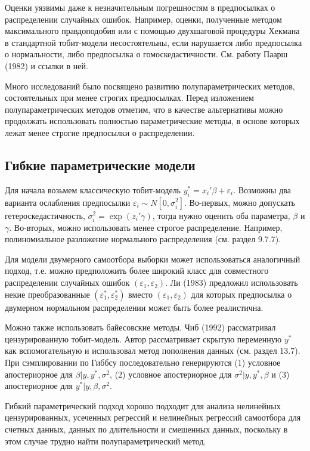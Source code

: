Оценки уязвимы даже к незначительным погрешностям в предпосылках о распределении случайных ошибок. Например, оценки, полученные методом максимального правдоподобия или с помощью двухшаговой процедуры Хекмана в стандартной тобит-модели несостоятельны, если нарушается либо предпосылка о нормальности, либо предпосылка о гомоскедастичности. См. работу Паарш (1982) и ссылки в ней.

Много исследований было посвящено развитию полупараметрических методов, состоятельных при менее строгих предпосылках. Перед изложением полупараметрических методов отметим, что в качестве альтернативы можно продолжать использовать полностью параметрические методы, в основе которых лежат менее строгие предпосылки о распределении.

\subsection{Гибкие параметрические модели}

Для начала возьмем классическую тобит-модель $y_i^{*}=x_i'\beta+\varepsilon_i$. Возможны два варианта ослабления предпосылки $\varepsilon_i \sim N[0,\sigma_i^2]$. Во-первых, можно допускать гетероскедастичность, $\sigma_i^2=\exp (z_i'\gamma)$, тогда нужно оценить оба параметра, $\beta$ и $\gamma$. Во-вторых, можно использовать менее строгое распределение. Например, полиномиальное разложение нормального распределения (см. раздел 9.7.7).

Для модели двумерного самоотбора выборки может использоваться аналогичный подход, т.е. можно предположить более широкий класс для совместного  распределении случайных ошибок $(\varepsilon_1,\varepsilon_2)$. Ли (1983) предложил использовать некие преобразованные $(\varepsilon_1^{*},\varepsilon_2^{*})$ вместо $(\varepsilon_1,\varepsilon_2)$ для которых предпосылка о двумерном нормальном распределении может быть более реалистична. 

Можно также использовать байесовские методы. Чиб (1992) рассматривал цензурированную тобит-модель. Автор рассматривает скрытую переменную $y^* $ как вспомогательную и использовал метод пополнения данных (см. раздел 13.7). При сэмплировании по Гиббсу последовательно генерируются  (1) условное апостериорное для $\beta|y,y^* ,\sigma^2$, (2) условное апостериорное для $\sigma^2|y,y^* ,\beta$ и (3) апостериорное для $y^* |y,\beta,\sigma^2$.

Гибкий параметрический подход хорошо подходит для анализа нелинейных цензурированных, усеченных регрессий и нелинейных регрессий самоотбора для счетных данных, данных по длительности и смешенных данных, поскольку в этом случае трудно найти полупараметрический метод.


